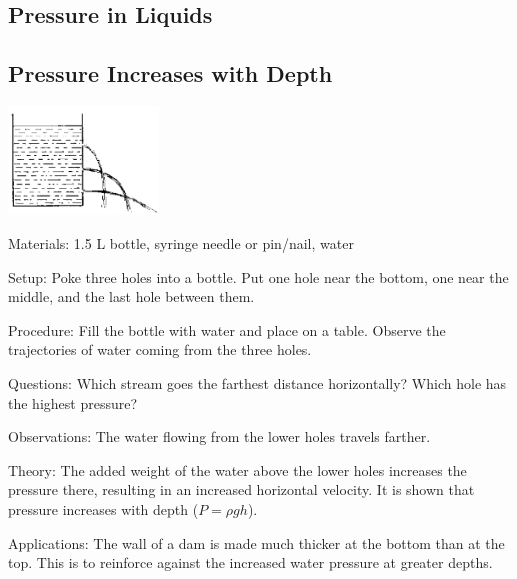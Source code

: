 \begin{multicols}{2}
\vfill
\columnbreak


\section*{Pressure in Liquids}


\subsection{Pressure Increases with Depth}

\begin{center}
\includegraphics[width=0.3\textwidth]{./img/source/pressure-depth.png}
\end{center}

\begin{description*}
\item[Materials:]{1.5 L bottle, syringe needle or pin/nail, water}
\item[Setup:]{Poke three holes into a bottle. Put one hole near the bottom, one near the middle, and the last hole between them.}
\item[Procedure:]{Fill the bottle with water and place on a table. Observe the trajectories of water coming from the three holes.}
\item[Questions:]{Which stream goes the farthest distance horizontally? Which hole has the highest pressure?}
\item[Observations:]{The water flowing from the lower holes travels farther.}
\item[Theory:]{The added weight of the water above the lower holes increases the pressure there, resulting in an increased horizontal velocity. It is shown that pressure increases with depth ($P = \rho g h$).}
\item[Applications:]{The wall of a dam is made much thicker at the bottom than at the top. This is to reinforce against the increased water pressure at greater depths.}
\end{description*}


\end{multicols}
